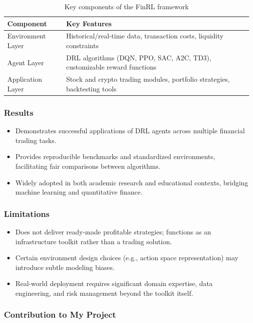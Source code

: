 \documentclass[12pt,a4paper]{report}
\begin{document}
\begin{table}[h]
\centering
\caption{Key components of the FinRL framework}
\begin{tabular}{p{4cm} p{8.5cm}}
\toprule
\textbf{Component} & \textbf{Key Features} \\
\midrule
Environment Layer & Historical/real-time data, transaction costs, liquidity constraints \\
Agent Layer & DRL algorithms (DQN, PPO, SAC, A2C, TD3), customizable reward functions \\
Application Layer & Stock and crypto trading modules, portfolio strategies, backtesting tools \\
\bottomrule
\end{tabular}
\end{table}

\subsubsection{Results}
\begin{itemize}
    \item Demonstrates successful applications of DRL agents across multiple financial trading tasks.  
    \item Provides reproducible benchmarks and standardized environments, facilitating fair comparisons between algorithms.  
    \item Widely adopted in both academic research and educational contexts, bridging machine learning and quantitative finance.  
\end{itemize}

\subsubsection{Limitations}
\begin{itemize}
    \item Does not deliver ready-made profitable strategies; functions as an infrastructure toolkit rather than a trading solution.  
    \item Certain environment design choices (e.g., action space representation) may introduce subtle modeling biases.  
    \item Real-world deployment requires significant domain expertise, data engineering, and risk management beyond the toolkit itself.  
\end{itemize}

\subsubsection{Contribution to My Project}
\end{document}
